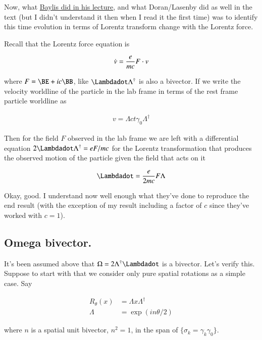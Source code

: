 \documentclass{article}
\begin{document}
Now, what 
\href{http://www.ime.unicamp.br/%7Eicca8/videos/baylis.avi}{Baylis did in his lecture}, and what Doran/Lasenby did as
well in the text (but I didn't understand it then when I read it the first time) was to identify this time evolution
in terms of Lorentz transform change with the Lorentz force.

Recall that the Lorentz force equation is

\begin{align*}
\dot{v} = \frac{e}{m c} F \cdot v
\end{align*}

where $F = \BE + i c \BB$, like $\Lambdadot\Lambda^\dagger$ is also a bivector.  If we write the velocity worldline
of the particle in the lab frame in terms of the rest frame particle worldline as

\begin{align*}
v = \Lambda c t \gamma_0 \Lambda^\dagger
\end{align*}

Then for the field $F$ observed in the lab frame we are left with a differential equation 
$2 \Lambdadot \Lambda^\dagger = e F / mc$
for the Lorentz transformation
that produces the observed motion of the particle given the field that acts on it

\begin{align}
\Lambdadot = \frac{e}{2 m c} F \Lambda
\end{align}

Okay, good.  I understand now well enough what they've done to reproduce the end result (with the exception of my 
result including a factor of $c$ since they've worked with $c=1$).

\subsection{ Omega bivector. }

It's been assumed above that $\Omega = 2 \Lambda^\dagger \Lambdadot$ is a bivector.  Let's verify this.  Suppose to start
with that we consider only pure spatial rotations as a simple case.  Say

\begin{align*}
R_\theta(x) &= \Lambda x \Lambda^\dagger \\
\Lambda &= \exp( i n \theta/ 2 )
\end{align*}

where $n$ is a spatial unit bivector, $n^2 = 1$, in the span of $\{\sigma_k = \gamma_k \gamma_0\}$.



\end{document}
